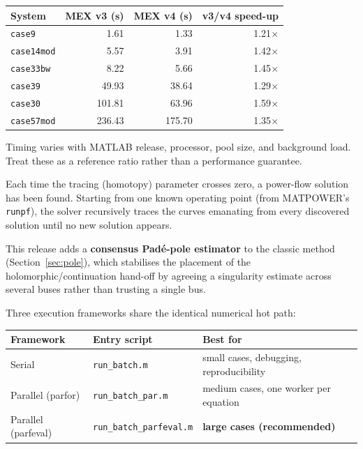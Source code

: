 \documentclass[11pt,a4paper]{article}
\newcommand{\code}[1]{\texttt{#1}}
\begin{document}
\begin{center}\small
\begin{tabular}{@{}lrrr@{}}
\toprule
System & MEX v3 (s) & MEX v4 (s) & v3/v4 speed-up\\
\midrule
\code{case9} & 1.61 & 1.33 & 1.21$\times$\\
\code{case14mod} & 5.57 & 3.91 & 1.42$\times$\\
\code{case33bw} & 8.22 & 5.66 & 1.45$\times$\\
\code{case39} & 49.93 & 38.64 & 1.29$\times$\\
\code{case30} & 101.81 & 63.96 & 1.59$\times$\\
\code{case57mod} & 236.43 & 175.70 & 1.35$\times$\\
\bottomrule
\end{tabular}
\end{center}

Timing varies with MATLAB release, processor, pool size, and background load. Treat these
as a reference ratio rather than a performance guarantee.

Each time the tracing (homotopy) parameter crosses zero, a power-flow solution has been
found. Starting from one known operating point (from MATPOWER's \code{runpf}), the solver
recursively traces the curves emanating from every discovered solution until no new
solution appears.

This release adds a \textbf{consensus Pad\'e-pole estimator} to the classic method
(Section~\ref{sec:pole}), which stabilises the placement of the holomorphic/continuation
hand-off by agreeing a singularity estimate across several buses rather than trusting a
single bus.

Three execution frameworks share the identical numerical hot path:

\begin{center}
\begin{tabular}{@{}lll@{}}
\toprule
Framework & Entry script & Best for\\
\midrule
Serial            & \code{run_batch.m}          & small cases, debugging, reproducibility\\
Parallel (parfor) & \code{run_batch_par.m}      & medium cases, one worker per equation\\
Parallel (parfeval)& \code{run_batch_parfeval.m} & \textbf{large cases (recommended)}\\
\bottomrule
\end{tabular}
\end{center}
\end{document}
